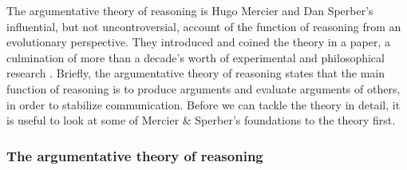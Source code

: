 The argumentative theory of reasoning is Hugo Mercier and Dan Sperber's influential, but not uncontroversial, account of the function of reasoning from an evolutionary perspective. They introduced and coined the theory in a \citeyear{MS11} paper, a culmination of more than a decade's worth of experimental and philosophical research \citep{Sperber01, Sperber10, MS09, Sperber00}.
Briefly, the argumentative theory of reasoning states that the main function of reasoning is to produce arguments and evaluate arguments of others, in order to stabilize communication.
Before we can tackle the theory in detail, it is useful to look at some of Mercier \& Sperber's foundations to the theory first.

\subsubsection{The argumentative theory of reasoning}

